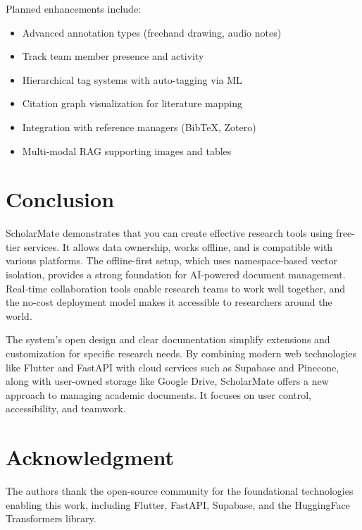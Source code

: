 \documentclass[conference]{IEEEtran}
\begin{document}
Planned enhancements include:

\begin{itemize}
\item Advanced annotation types (freehand drawing, audio notes)
\item Track team member presence and activity
\item Hierarchical tag systems with auto-tagging via ML
\item Citation graph visualization for literature mapping
\item Integration with reference managers (BibTeX, Zotero)
\item Multi-modal RAG supporting images and tables
\end{itemize}

\section{Conclusion}

ScholarMate demonstrates that you can create effective research tools using free-tier services. It allows data ownership, works offline, and is compatible with various platforms. The offline-first setup, which uses namespace-based vector isolation, provides a strong foundation for AI-powered document management. Real-time collaboration tools enable research teams to work well together, and the no-cost deployment model makes it accessible to researchers around the world.

The system's open design and clear documentation simplify extensions and customization for specific research needs. By combining modern web technologies like Flutter and FastAPI with cloud services such as Supabase and Pinecone, along with user-owned storage like Google Drive, ScholarMate offers a new approach to managing academic documents. It focuses on user control, accessibility, and teamwork.

\section*{Acknowledgment}

The authors thank the open-source community for the foundational technologies enabling this work, including Flutter, FastAPI, Supabase, and the HuggingFace Transformers library.
\end{document}
